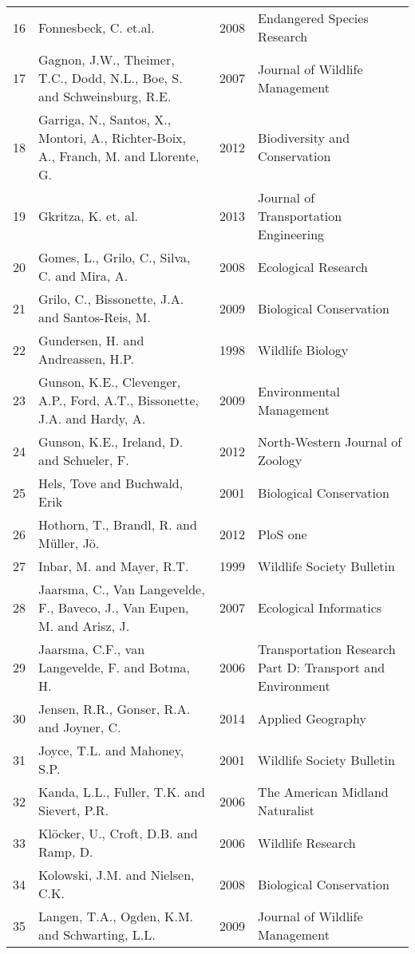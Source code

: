 \begin{table}[htp]
\begin{tabularx}{0.9\textwidth}{lYll}
   16 & Fonnesbeck, C. et.al. & 2008 & Endangered Species Research \\ 
   17 & Gagnon, J.W., Theimer, T.C., Dodd, N.L., Boe, S. and Schweinsburg, R.E. & 2007 & Journal of Wildlife Management \\ 
   18 & Garriga, N., Santos, X., Montori, A., Richter-Boix, A., Franch, M. and Llorente, G. & 2012 & Biodiversity and Conservation \\ 
   19 & Gkritza, K. et. al. & 2013 & Journal of Transportation Engineering \\ 
   20 & Gomes, L., Grilo, C., Silva, C. and Mira, A. & 2008 & Ecological Research \\ 
   21 & Grilo, C., Bissonette, J.A. and Santos-Reis, M. & 2009 & Biological Conservation \\ 
   22 & Gundersen, H. and Andreassen, H.P. & 1998 & Wildlife Biology \\ 
   23 & Gunson, K.E., Clevenger, A.P., Ford, A.T., Bissonette, J.A. and Hardy, A. & 2009 & Environmental Management \\ 
   24 & Gunson, K.E., Ireland, D. and Schueler, F. & 2012 & North-Western Journal of Zoology \\ 
   25 & Hels, Tove and Buchwald, Erik & 2001 & Biological Conservation \\ 
   26 & Hothorn, T., Brandl, R. and Müller, Jö. & 2012 & PloS one \\ 
   27 & Inbar, M. and Mayer, R.T. & 1999 & Wildlife Society Bulletin \\ 
   28 & Jaarsma, C., Van Langevelde, F., Baveco, J., Van Eupen, M. and Arisz, J. & 2007 & Ecological Informatics \\ 
   29 & Jaarsma, C.F., van Langevelde, F. and Botma, H. & 2006 & Transportation Research Part D: Transport and Environment  \\ 
   30 & Jensen, R.R., Gonser, R.A. and Joyner, C. & 2014 & Applied Geography \\ 
   31 & Joyce, T.L. and Mahoney, S.P. & 2001 & Wildlife Society Bulletin \\ 
   32 & Kanda, L.L., Fuller, T.K. and Sievert, P.R. & 2006 & The American Midland Naturalist \\ 
   33 & Klöcker, U., Croft, D.B. and Ramp, D. & 2006 & Wildlife Research \\ 
   34 & Kolowski, J.M. and Nielsen, C.K. & 2008 & Biological Conservation  \\ 
   35 & Langen, T.A., Ogden, K.M. and Schwarting, L.L. & 2009 & Journal of Wildlife Management \\ 

\end{tabularx}
\end{table}
